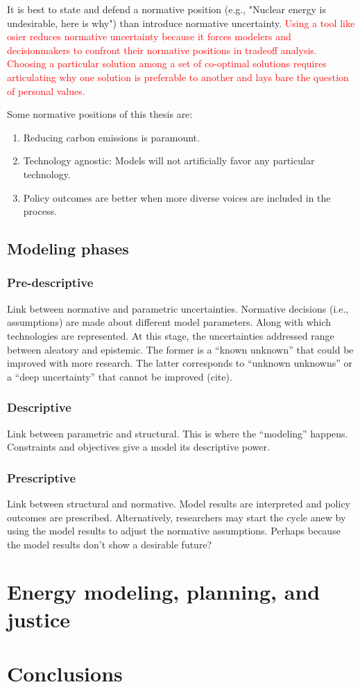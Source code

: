 It is best to state and defend a normative position (e.g., "Nuclear energy is
undesirable, here is why") than introduce normative uncertainty.
\textcolor{red}{Using a tool like \ac{osier} reduces normative uncertainty
because it forces modelers and decisionmakers to confront their normative
positions in tradeoff analysis. Choosing a particular solution among a set of
co-optimal solutions requires articulating why one solution is preferable to
another and lays bare the question of personal values.}

Some normative positions of this thesis are:
\begin{enumerate}
    \item Reducing carbon emissions is paramount.
    \item Technology agnostic: Models will not artificially favor any particular technology.
    \item Policy outcomes are better when more diverse voices are included in the process.
\end{enumerate}

\section{Modeling phases}

\subsection{Pre-descriptive}

Link between normative and parametric uncertainties. Normative decisions (i.e., assumptions)
are made about different model parameters. Along with which technologies are represented.
At this stage, the uncertainties addressed range between aleatory and epistemic. The former 
is a ``known unknown'' that could be improved with more research. The latter corresponds to 
``unknown unknowns'' or a ``deep uncertainty'' that cannot be improved (cite).

\subsection{Descriptive}
Link between parametric and structural. This is where the ``modeling'' happens. Constraints
and objectives give a model its descriptive power.

\subsection{Prescriptive}
Link between structural and normative. Model results are interpreted and policy outcomes
are prescribed. Alternatively, researchers may start the cycle anew by using the model
results to adjust the normative assumptions. Perhaps because the model results don't show
a desirable future?


\chapter{Energy modeling, planning, and justice}
\label{chapter:communities}
% 

\chapter{Conclusions}
